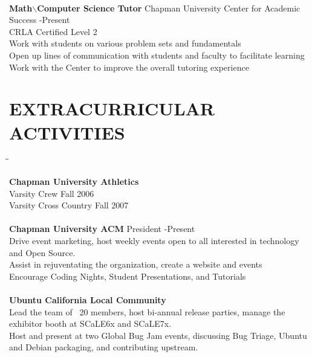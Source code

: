 \documentclass{res}
\begin{document}
\begin{resume}
\begin{tabbing}
\\

   {\bf Math$\backslash$Computer Science Tutor}  \>Chapman University Center for Academic Success -Present\\
	 CRLA Certified Level 2\\
	 Work with students on various problem sets and fundamentals\\
	 Open up lines of communication with students and faculty to facilitate learning\\
	 Work with the Center to improve the overall tutoring experience\\
	\end{tabbing}
 
   \vspace{-0.2in}	
\section{EXTRACURRICULAR ACTIVITIES}          
	\vspace{-5pt}
   \begin{tabbing}
   \hspace{2.5in}\= \hspace{3.45in}\= \kill %

    {\bf Chapman University Athletics}\\
	\vspace{-18pt}
    \hspace{-4pt}Varsity Crew \> \>Fall 2006\\
	 Varsity Cross Country \> \>Fall 2007\\

\\

    {\bf Chapman University ACM} \> President -Present\\
	 Drive event marketing, host weekly events open to all interested in technology and Open Source.\\
	 Assist in rejuventating the organization, create a website and events\\
	 Encourage Coding Nights, Student Presentations, and Tutorials\\

\\

    {\bf Ubuntu California Local Community} \\
   \vspace{8pt}
	Lead the team of ~20 members, host bi-annual release parties, manage the exhibitor booth at SCaLE6x and SCaLE7x. \\
	Host and present at two Global Bug Jam events, discussing Bug Triage, Ubuntu and Debian packaging, and contributing upstream. \\


\end{tabbing}
\end{resume}
\end{document}
